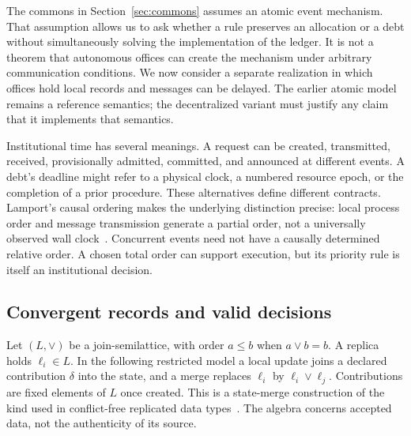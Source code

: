 \documentclass[11pt,letterpaper]{article}
\theoremstyle{plain}
\theoremstyle{definition}
\theoremstyle{remark}
\begin{document}
The commons in Section~\ref{sec:commons} assumes an atomic event mechanism. That assumption allows us to ask whether a rule preserves an allocation or a debt without simultaneously solving the implementation of the ledger. It is not a theorem that autonomous offices can create the mechanism under arbitrary communication conditions. We now consider a separate realization in which offices hold local records and messages can be delayed. The earlier atomic model remains a reference semantics; the decentralized variant must justify any claim that it implements that semantics.

Institutional time has several meanings. A request can be created, transmitted, received, provisionally admitted, committed, and announced at different events. A debt's deadline might refer to a physical clock, a numbered resource epoch, or the completion of a prior procedure. These alternatives define different contracts. Lamport's causal ordering makes the underlying distinction precise: local process order and message transmission generate a partial order, not a universally observed wall clock~\cite{lamporttime}. Concurrent events need not have a causally determined relative order. A chosen total order can support execution, but its priority rule is itself an institutional decision.

\subsection{Convergent records and valid decisions}
Let $(L,\vee)$ be a join-semilattice, with order $a\leq b$ when $a\vee b=b$. A replica holds $\ell_i\in L$. In the following restricted model a local update joins a declared contribution $\delta$ into the state, and a merge replaces $\ell_i$ by $\ell_i\vee\ell_j$. Contributions are fixed elements of $L$ once created. This is a state-merge construction of the kind used in conflict-free replicated data types~\cite{preguicacrdt}. The algebra concerns accepted data, not the authenticity of its source.
\end{document}
